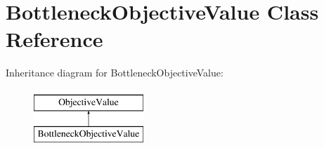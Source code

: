 \hypertarget{classBottleneckObjectiveValue}{\section{Bottleneck\-Objective\-Value Class Reference}
\label{classBottleneckObjectiveValue}
}
Inheritance diagram for Bottleneck\-Objective\-Value\-:\begin{figure}[H]
\begin{center}
\leavevmode
\includegraphics[height=2.000000cm]{classBottleneckObjectiveValue}
\end{center}
\end{figure}
